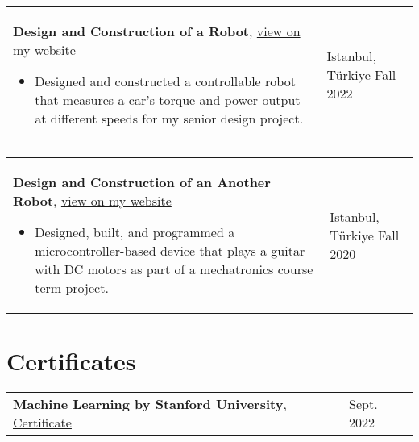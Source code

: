 \documentclass[10pt, a4paper]{article}
\newenvironment{highlights}{
        \begin{itemize}[
                topsep=0pt,
                parsep=0.07 cm,
                partopsep=0pt,
                itemsep=0pt,
                after=\vspace*{-1\baselineskip},
                leftmargin=0.6 cm + 3pt
            ]
    }{
        \end{itemize}
    } %
\let\hrefWithoutArrow\href
\renewcommand{\href}[2]{\hrefWithoutArrow{#1}{#2 \raisebox{.15ex}{\footnotesize \faExternalLink*}}}
\begin{document}
        \begin{tabularx}{ cm-0.13cm}{K{0.2 cm} R{3.6 cm}}
            \textbf{Design and Construction of a Robot}, \href{https://example.com/}{view on my website}
            \vspace*{0.12 cm}
            \begin{highlights}
                \item Designed and constructed a controllable robot that measures a car's torque and power output at different speeds for my senior design project. \hspace*{-0.2cm}
            \end{highlights}
        &
            Istanbul, Türkiye \newline
            Fall 2022
        \end{tabularx}

        \vspace*{0.12 cm}
        
        \begin{tabularx}{ cm-0.13cm}{K{0.2 cm} R{3.6 cm}}
            \textbf{Design and Construction of an Another Robot}, \href{https://example.com/}{view on my website}
            \vspace*{0.12 cm}
            \begin{highlights}
                \item Designed, built, and programmed a microcontroller-based device that plays a guitar with DC motors as part of a mechatronics course term project. \hspace*{-0.2cm}
            \end{highlights}
        &
            Istanbul, Türkiye \newline
            Fall 2020
        \end{tabularx}



    \section{Certificates}
    
        \begin{tabularx}{ cm-0.13cm}{K{0.2 cm} R{3.6 cm}}
            \textbf{Machine Learning by Stanford University}, \href{https://example.com/}{Certificate}
            \vspace*{0.12 cm}
        &
            Sept. 2022
        \end{tabularx}
\end{document}
